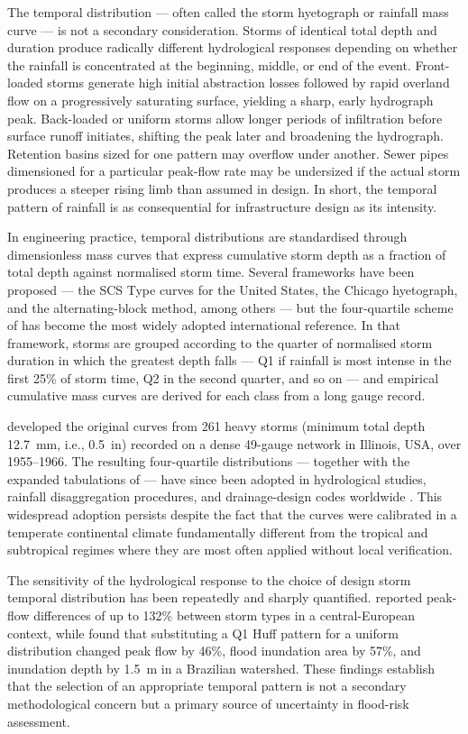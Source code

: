 \documentclass[a4paper,fleqn]{cas-sc}
\begin{document}
The temporal distribution — often called the storm hyetograph or
rainfall mass curve — is not a secondary consideration. Storms of
identical total depth and duration produce radically different
hydrological responses depending on whether the rainfall is concentrated
at the beginning, middle, or end of the event. Front-loaded storms
generate high initial abstraction losses followed by rapid overland
flow on a progressively saturating surface, yielding a sharp,
early hydrograph peak. Back-loaded or uniform storms allow longer
periods of infiltration before surface runoff initiates, shifting
the peak later and broadening the hydrograph. Retention basins sized
for one pattern may overflow under another. Sewer pipes dimensioned
for a particular peak-flow rate may be undersized if the actual storm
produces a steeper rising limb than assumed in design. In short,
the temporal pattern of rainfall is as consequential for infrastructure
design as its intensity.

In engineering practice, temporal distributions are standardised
through dimensionless mass curves that express cumulative storm depth
as a fraction of total depth against normalised storm time. Several
frameworks have been proposed — the SCS Type curves for the United
States, the Chicago hyetograph, and the alternating-block method,
among others — but the four-quartile scheme of \citet{Huff1967}
has become the most widely adopted international reference.
In that framework, storms are grouped according to the quarter of
normalised storm duration in which the greatest depth falls — Q1
if rainfall is most intense in the first 25\% of storm time, Q2
in the second quarter, and so on — and empirical cumulative mass
curves are derived for each class from a long gauge record.

\citet{Huff1967} developed the original curves from 261 heavy storms
(minimum total depth 12.7~mm, i.e., 0.5~in) recorded on a
dense 49-gauge network in Illinois, USA, over 1955–1966. The
resulting four-quartile distributions — together with the expanded
tabulations of \citet{HuffAngel1992} — have since been adopted in
hydrological studies, rainfall disaggregation procedures, and
drainage-design codes worldwide \citep{Bonta2004, Bezak2018}.
This widespread adoption persists despite the fact that the curves
were calibrated in a temperate continental climate fundamentally
different from the tropical and subtropical regimes where they are
most often applied without local verification.

The sensitivity of the hydrological response to the choice of design
storm temporal distribution has been repeatedly and sharply quantified.
\citet{Bezak2018} reported peak-flow differences of up to 132\%
between storm types in a central-European context, while
\citet{Abreu2017} found that substituting a Q1 Huff pattern for a
uniform distribution changed peak flow by 46\%, flood inundation area
by 57\%, and inundation depth by 1.5~m in a Brazilian watershed.
These findings establish that the selection of an appropriate temporal
pattern is not a secondary methodological concern but a primary source
of uncertainty in flood-risk assessment.
\end{document}
